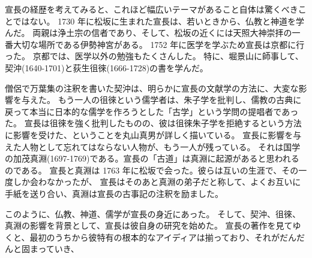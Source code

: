 \documentclass[12pt]{report}
\begin{document}
宣長の経歴を考えてみると、これほど幅広いテーマがあること自体は驚くべきことではない。
1730 年に松坂に生まれた宣長は、若いときから、仏教と神道を学んだ。
両親は浄土宗の信者であり、そして、松坂の近くには天照大神崇拝の一番大切な場所である伊勢神宮がある。
1752 年に医学を学ぶため宣長は京都に行った。
京都では、医学以外の勉強もたくさんした。
特に、堀景山に師事して、契沖(1640-1701)と荻生徂徠(1666-1728)の書を学んだ。

僧侶で万葉集の注釈を書いた契沖は、明らかに宣長の文献学の方法に、大変な影響を与えた。
もう一人の徂徠という儒学者は、朱子学を批判し、儒教の古典に戻って本当に日本的な儒学を作ろうとした「古学」という学問の提唱者であった。
宣長は徂徠を強く批判したものの、彼は徂徠朱子学を拒絶するという方法に影響を受けた、ということを丸山真男が詳しく描いている。
宣長に影響を与えた人物として忘れてはならない人物が、もう一人が残っている。
それは国学の加茂真淵(1697-1769)である。宣長の「古道」は真淵に起源があると思われるのである。
宣長と真淵は 1763 年に松坂で会った。彼らは互いの生涯で、その一度しか会わなかったが、
宣長はそのあと真淵の弟子だと称して、よくお互いに手紙を送り合い、真淵は宣長の古事記の注釈を励ました。

このように、仏教、神道、儒学が宣長の身近にあった。
そして、契沖、徂徠、真淵の影響を背景として、宣長は彼自身の研究を始めた。
宣長の著作を見てゆくと、最初のうちから彼特有の根本的なアイディアは揃っており、それがだんだんと固まっていき、
\end{document}
